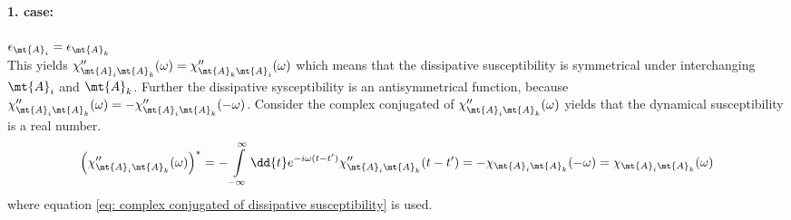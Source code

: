 \paragraph{1. case:} $\epsilon_{\mt{A}_{i}} = \epsilon_{\mt{A}_{k}}$\\
%
This yields $\chi''_{\mt{A}_{i} \mt{A}_{k}}(\omega) = \chi''_{\mt{A}_{k} \mt{A}_{i}}(\omega)$ which means that the dissipative susceptibility is symmetrical under interchanging $\mt{A}_{i}$ and $\mt{A}_{k}$.
Further the dissipative sysceptibility is an antisymmetrical function, because $\chi''_{\mt{A}_{i} \mt{A}_{k}}(\omega) = -\chi''_{\mt{A}_{i} \mt{A}_{k}}(-\omega)$.
Consider the complex conjugated of $\chi''_{\mt{A}_{i} \mt{A}_{k}}(\omega)$ yields that the dynamical susceptibility is a real number.
%
\begin{align}
	\Big(\chi''_{\mt{A}_{i} \mt{A}_{k}}(\omega)\Big)^{*} = -\int\limits_{-\infty}^{\infty} \dd{t} e^{-i\omega(t-t')} \chi''_{\mt{A}_{i} \mt{A}_{k}}(t-t') = -\chi_{\mt{A}_{i} \mt{A}_{k}}(-\omega) = \chi_{\mt{A}_{i} \mt{A}_{k}}(\omega)
\end{align}
%
where equation \eqref{eq: complex conjugated of dissipative susceptibility} is used.
%
